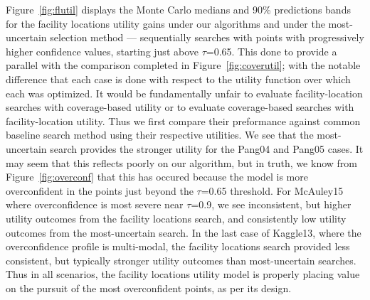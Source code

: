 \documentclass[10pt, conference]{IEEEtran}
\begin{document}
Figure~\ref{fig:flutil} displays the Monte Carlo medians and 90\% predictions bands for the facility locations utility gains under our algorithms and under the most-uncertain selection method --- sequentially searches with points with progressively higher confidence values, starting just above $\tau$=0.65. This done to provide a parallel with the comparison completed in Figure~\ref{fig:coverutil}; with the notable difference that each case is done with respect to the utility function over which each was optimized. It would be fundamentally unfair to evaluate facility-location searches with coverage-based utility or to evaluate coverage-based searches with facility-location utility. Thus we first compare their preformance against common baseline search method using their respective utilities. We see that the most-uncertain search provides the stronger utility for the Pang04 and Pang05 cases. It may seem that this reflects poorly on our algorithm, but in truth, we know from Figure~\ref{fig:overconf} that this has occured because the model is more overconfident in the points just beyond the $\tau$=0.65 threshold. 
For McAuley15 where overconfidence is most severe near $\tau$=0.9, we see inconsistent, but higher utility outcomes from the facility locations search, and consistently low utility outcomes from the most-uncertain search. In the last case of Kaggle13, where the overconfidence profile is multi-modal, the facility locations search provided less consistent, but typically stronger utility outcomes than most-uncertain searches. Thus in all scenarios, the facility locations utility model is properly placing value on the pursuit of the most overconfident points, as per its design.

\end{document}
